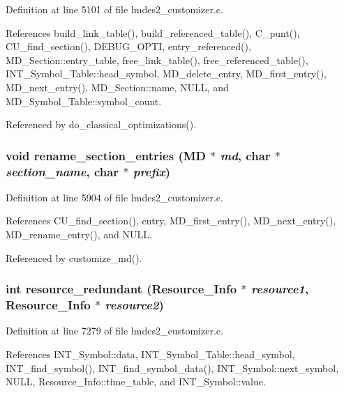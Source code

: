 Definition at line 5101 of file lmdes2\_\-customizer.c.

References build\_\-link\_\-table(), build\_\-referenced\_\-table(), C\_\-punt(), CU\_\-find\_\-section(), DEBUG\_\-OPTI, entry\_\-referenced(), MD\_\-Section::entry\_\-table, free\_\-link\_\-table(), free\_\-referenced\_\-table(), INT\_\-Symbol\_\-Table::head\_\-symbol, MD\_\-delete\_\-entry, MD\_\-first\_\-entry(), MD\_\-next\_\-entry(), MD\_\-Section::name, NULL, and MD\_\-Symbol\_\-Table::symbol\_\-count.

Referenced by do\_\-classical\_\-optimizations().
\subsubsection{\setlength{\rightskip}{0pt plus 5cm}void rename\_\-section\_\-entries (\bf{MD} $\ast$ {\em md}, char $\ast$ {\em section\_\-name}, char $\ast$ {\em prefix})}\label{lmdes2__customizer_8c_7c5c454e016c0ad79e30d314beb9f3fd}




Definition at line 5904 of file lmdes2\_\-customizer.c.

References CU\_\-find\_\-section(), entry, MD\_\-first\_\-entry(), MD\_\-next\_\-entry(), MD\_\-rename\_\-entry(), and NULL.

Referenced by customize\_\-md().
\subsubsection{\setlength{\rightskip}{0pt plus 5cm}int resource\_\-redundant (\bf{Resource\_\-Info} $\ast$ {\em resource1}, \bf{Resource\_\-Info} $\ast$ {\em resource2})}\label{lmdes2__customizer_8c_ddf6fc9b02168b82e781ab4cfb4f96a2}




Definition at line 7279 of file lmdes2\_\-customizer.c.

References INT\_\-Symbol::data, INT\_\-Symbol\_\-Table::head\_\-symbol, INT\_\-find\_\-symbol(), INT\_\-find\_\-symbol\_\-data(), INT\_\-Symbol::next\_\-symbol, NULL, Resource\_\-Info::time\_\-table, and INT\_\-Symbol::value.

